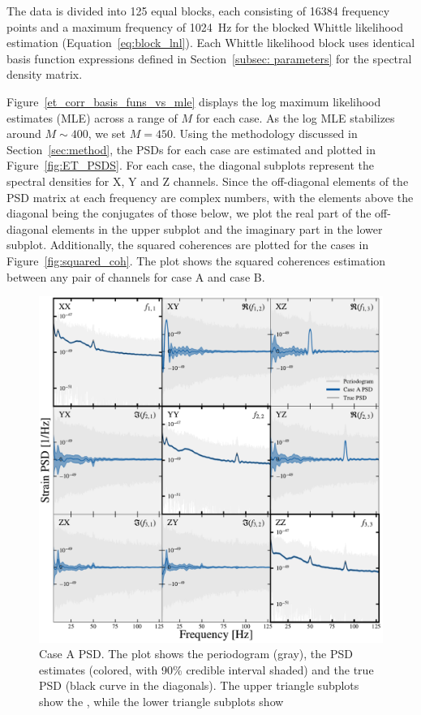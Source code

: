 \documentclass[%
 reprint,
 amsmath,amssymb,
 aps,
 nofootinbib,
]{revtex4-2}
\begin{document}
The data is divided into 125 equal blocks, each consisting of \num{16 384} frequency points and a maximum frequency of \SI{1024}{Hz} for the blocked Whittle likelihood estimation (Equation~\ref{eq:block_lnl}). 
Each Whittle likelihood block uses identical basis function expressions defined in Section~\ref{subsec: parameters} for the spectral density matrix. 

Figure~\ref{et_corr_basis_funs_vs_mle} displays the log maximum
likelihood estimates (MLE) across a range of $M$ for each case.
As the log MLE stabilizes around $M\sim400$, we set $M=450$.
Using the methodology discussed in Section~\ref{sec:method}, the PSDs for each case are estimated and plotted in Figure~\ref{fig:ET_PSDS}. For each case, the diagonal subplots represent the spectral densities for X, Y and Z channels. Since the off-diagonal elements of the PSD matrix at each frequency are complex numbers, with the elements above the diagonal being the conjugates of those below, we plot the real part of the off-diagonal elements in the upper subplot and the imaginary part in the lower subplot.
Additionally, the squared coherences are plotted for the cases in Figure~\ref{fig:squared_coh}. The plot shows the squared coherences estimation between any pair of channels for case A and case B.


\begin{figure}
\centering
\includegraphics[width=\textwidth]{caseA_psd.pdf}
\caption{Case A PSD. The plot shows the periodogram (gray), the PSD estimates (colored, with 90\% credible interval shaded) and the true PSD (black curve in the diagonals). The upper triangle subplots show the , while the lower triangle subplots show }
\label{fig:caseA_psd}
\end{figure}
\end{document}
